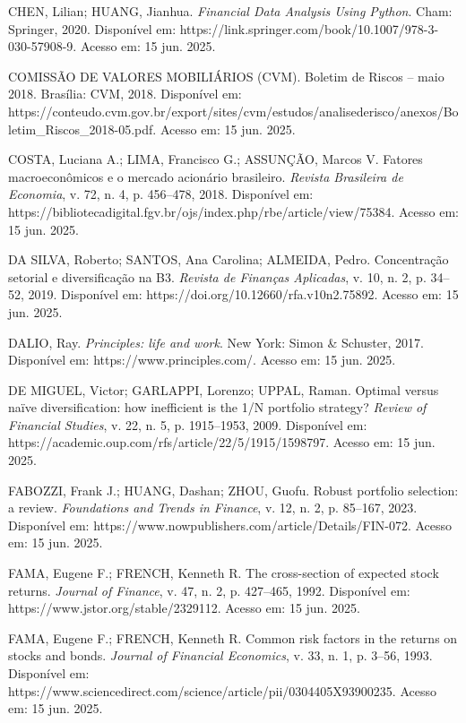 \noindent
CHEN, Lilian; HUANG, Jianhua. \textit{Financial Data Analysis Using Python}. Cham: Springer, 2020. Disponível em: https://link.springer.com/book/10.1007/978-3-030-57908-9. Acesso em: 15 jun. 2025.

\noindent
COMISSÃO DE VALORES MOBILIÁRIOS (CVM). Boletim de Riscos -- maio 2018. Brasília: CVM, 2018. Disponível em: https://conteudo.cvm.gov.br/export/sites/cvm/estudos/analisederisco/anexos/Boletim\_Riscos\_2018-05.pdf. Acesso em: 15 jun. 2025.

\noindent
COSTA, Luciana A.; LIMA, Francisco G.; ASSUNÇÃO, Marcos V. Fatores macroeconômicos e o mercado acionário brasileiro. \textit{Revista Brasileira de Economia}, v. 72, n. 4, p. 456--478, 2018. Disponível em: https://bibliotecadigital.fgv.br/ojs/index.php/rbe/article/view/75384. Acesso em: 15 jun. 2025.

\noindent
DA SILVA, Roberto; SANTOS, Ana Carolina; ALMEIDA, Pedro. Concentração setorial e diversificação na B3. \textit{Revista de Finanças Aplicadas}, v. 10, n. 2, p. 34--52, 2019. Disponível em: https://doi.org/10.12660/rfa.v10n2.75892. Acesso em: 15 jun. 2025.

\noindent
DALIO, Ray. \textit{Principles: life and work}. New York: Simon \& Schuster, 2017. Disponível em: https://www.principles.com/. Acesso em: 15 jun. 2025.

\noindent
DE MIGUEL, Victor; GARLAPPI, Lorenzo; UPPAL, Raman. Optimal versus naïve diversification: how inefficient is the 1/N portfolio strategy? \textit{Review of Financial Studies}, v. 22, n. 5, p. 1915--1953, 2009. Disponível em: https://academic.oup.com/rfs/article/22/5/1915/1598797. Acesso em: 15 jun. 2025.

\noindent
FABOZZI, Frank J.; HUANG, Dashan; ZHOU, Guofu. Robust portfolio selection: a review. \textit{Foundations and Trends in Finance}, v. 12, n. 2, p. 85--167, 2023. Disponível em: https://www.nowpublishers.com/article/Details/FIN-072. Acesso em: 15 jun. 2025.

\noindent
FAMA, Eugene F.; FRENCH, Kenneth R. The cross-section of expected stock returns. \textit{Journal of Finance}, v. 47, n. 2, p. 427--465, 1992. Disponível em: https://www.jstor.org/stable/2329112. Acesso em: 15 jun. 2025.

\noindent
FAMA, Eugene F.; FRENCH, Kenneth R. Common risk factors in the returns on stocks and bonds. \textit{Journal of Financial Economics}, v. 33, n. 1, p. 3--56, 1993. Disponível em: https://www.sciencedirect.com/science/article/pii/0304405X93900235. Acesso em: 15 jun. 2025.


